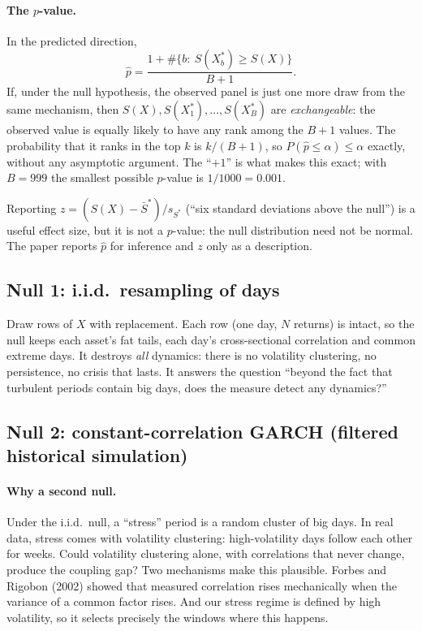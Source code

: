 \documentclass[11pt]{article}
\theoremstyle{plain}
\theoremstyle{definition}
\theoremstyle{remark}
\begin{document}
\paragraph{The $p$-value.} In the predicted direction,
\[
\hat p=\frac{1+\#\{b:\ S(X^*_b)\ge S(X)\}}{B+1}.
\]
If, under the null hypothesis, the observed panel is just one more draw from
the same mechanism, then $S(X),S(X^*_1),\dots,S(X^*_B)$ are
\emph{exchangeable}: the observed value is equally likely to have any rank
among the $B+1$ values. The probability that it ranks in the top $k$ is
$k/(B+1)$, so $P(\hat p\le\alpha)\le\alpha$ exactly, without any asymptotic
argument. The ``$+1$'' is what makes this exact; with $B=999$ the smallest
possible $p$-value is $1/1000=0.001$.

\begin{piege}
Reporting $z=(S(X)-\bar S^*)/s_{S^*}$ (``six standard deviations above the
null'') is a useful effect size, but it is not a $p$-value: the null
distribution need not be normal. The paper reports $\hat p$ for inference and
$z$ only as a description.
\end{piege}

\subsection{Null 1: i.i.d.\ resampling of days}

Draw rows of $X$ with replacement. Each row (one day, $N$ returns) is intact,
so the null keeps each asset's fat tails, each day's cross-sectional
correlation and common extreme days. It destroys \emph{all} dynamics: there
is no volatility clustering, no persistence, no crisis that lasts. It answers
the question ``beyond the fact that turbulent periods contain big days, does
the measure detect any dynamics?''

\subsection{Null 2: constant-correlation GARCH (filtered historical simulation)}

\paragraph{Why a second null.} Under the i.i.d.\ null, a ``stress'' period is
a random cluster of big days. In real data, stress comes with volatility
clustering: high-volatility days follow each other for weeks. Could
volatility clustering alone, with correlations that never change, produce the
coupling gap? Two mechanisms make this plausible. Forbes and Rigobon (2002)
showed that measured correlation rises mechanically when the variance of a
common factor rises. And our stress regime is defined by high volatility, so
it selects precisely the windows where this happens.
\end{document}
